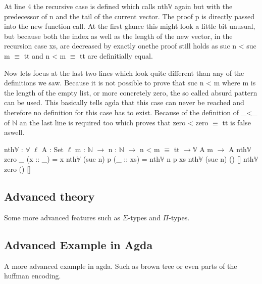 At line 4 the recursive case is defined which calls nth$\mathbb{V}$ again but with the predecessor of n and the tail of the current vector.
The proof p is directly passed into the new function call. At the first glance this might look a little bit unusual, but because both the index as well as the length of the new vector, in the recursion case xs, 
are decreased by exactly onethe proof still holds as suc n < suc m $\equiv$ tt and n < m $\equiv$ tt are definitially equal.

Now lets focus at the last two lines which look quite different than any of the definitions we saw.
Because it is not possible to prove that suc n < m where m is the length of the empty list, or more concretely zero, the so called absurd pattern can be used. This basically tells agda that this case can never be reached and therefore no definition for this case has to exist.
Because of the definition of \_<\_ of $\mathbb{N}$ an the last line is required too which proves that zero < zero $\equiv$ tt is false aswell.  

\begin{codesnippet}[mathescape=true, caption={Definition of nth function in Agda}, label={codeSnippet:vector_nth}]
nth$\mathbb{V}$ : $\forall$ {$\ell$} {A : Set $\ell$} {m : $\mathbb{N}$} $\rightarrow$
       n : $\mathbb{N}$ $\rightarrow$ n < m $\equiv$ tt $\rightarrow \mathbb{V}$ A m $\rightarrow$ A
nth$\mathbb{V}$ zero _ (x :: _) = x
nth$\mathbb{V}$ (suc n) p (_ :: xs) = nth$\mathbb{V}$ n p xs
nth$\mathbb{V}$ (suc n) () []
nth$\mathbb{V}$ zero () []
\end{codesnippet}


\subsection{Advanced theory}
Some more advanced features such as $\Sigma$-types and $\Pi$-types.

\subsection{Advanced Example in Agda}
A more advanced example in agda. Such as brown tree or even parts of the huffman encoding.